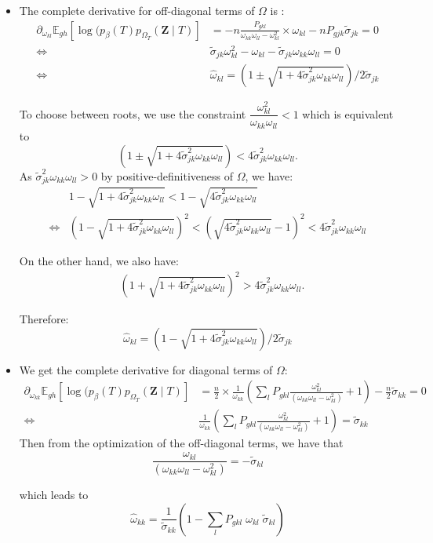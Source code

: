 \documentclass[11pt,a4paper]{article}
\newcommand{\Zbf}{\boldsymbol{Z}}
\newcommand{\Esp}{\mathds{E}}
\begin{document}
\begin{itemize}

\item The complete derivative for off-diagonal terms of $\Omega$ is :
\begin{align*}
 \partial_{\omega_{kl}}\Esp_{gh} [\log (p_\beta(T)p_{\Omega_T}(\Zbf\mid T) ] &=-n \frac{P_{gkl} }{\omega_{kk}\omega_{ll}-\omega_{kl}^2}\times \omega_{kl} - n P_{gjk}  \widetilde{\sigma}_{jk} =0\\
 \iff & \widetilde{\sigma}_{jk} \omega_{kl}^2 - \omega_{kl} - \widetilde{\sigma}_{jk} \omega_{kk}\omega_{ll} = 0 \\
 \iff & \widehat{\omega}_{kl} = (1 \pm \sqrt{1+4\widetilde{\sigma}_{jk}^2 \omega_{kk}\omega_{ll}}) / 2\widetilde{\sigma}_{jk}
\end{align*}

To choose between roots, we use the constraint $\dfrac{\omega_{kl}^2}{\omega_{kk}\omega_{ll}} < 1$ which is equivalent to 
$$ (1 \pm \sqrt{1+4\widetilde{\sigma}_{jk}^2 \omega_{kk}\omega_{ll}}) < 4\widetilde{\sigma}_{jk}^2 \omega_{kk}\omega_{ll}.$$
As $\widetilde{\sigma}_{jk}^2 \omega_{kk}\omega_{ll} > 0$ by positive-definitiveness of $\Omega$, we have:
\begin{align*}
&1 - \sqrt{1+4\widetilde{\sigma}_{jk}^2 \omega_{kk}\omega_{ll}} < 1- \sqrt{4\widetilde{\sigma}_{jk}^2 \omega_{kk}\omega_{ll}}\\
\iff &(1 - \sqrt{1+4\widetilde{\sigma}_{jk}^2 \omega_{kk}\omega_{ll}})^2 < ( \sqrt{4\widetilde{\sigma}_{jk}^2 \omega_{kk}\omega_{ll}}-1)^2 < 4\widetilde{\sigma}_{jk}^2 \omega_{kk}\omega_{ll}
\end{align*}

On the other hand, we also have:
\begin{align*}
&(1 + \sqrt{1+4\widetilde{\sigma}_{jk}^2 \omega_{kk}\omega_{ll}})^2 >4\widetilde{\sigma}_{jk}^2 \omega_{kk}\omega_{ll}.
\end{align*}

Therefore: $$\boxed{ \widehat{\omega}_{kl} = (1 - \sqrt{1+4\widetilde{\sigma}_{jk}^2 \omega_{kk}\omega_{ll}}) / 2\widetilde{\sigma}_{jk}}$$


\item We get the complete derivative for diagonal terms of $\Omega$:
\begin{align*}
 \partial_{\omega_{kk}}\Esp_{gh} [\log (p_\beta(T)p_{\Omega_T}(\Zbf\mid T) ] &=\frac{n}{2} \times\frac{1}{\omega_{kk}} \left(\sum_l P_{gkl} \frac{\omega_{kl}^2}{(\omega_{kk}\omega_{ll}-\omega_{kl}^2)} + 1\right) -\frac{n}{2}\widetilde{\sigma}_{kk} =0\\
 \iff &  \frac{1}{\omega_{kk}} \left(\sum_l P_{gkl} \frac{\omega_{kl}^2}{(\omega_{kk}\omega_{ll}-\omega_{kl}^2)} + 1\right) =\widetilde{\sigma}_{kk}
\end{align*}
Then from the optimization of the off-diagonal terms, we have that $$\frac{\omega_{kl}}{(\omega_{kk}\omega_{ll}-\omega_{kl}^2)}  = - \widetilde{\sigma}_{kl}  $$

which leads to 
$$\boxed{ \hat{\omega}_{kk} = \frac{1}{\widetilde{\sigma}_{kk}} \left( 1- \sum_l  P_{gkl} \;\omega_{kl} \;\widetilde{\sigma}_{kl}\right)}$$
\end{itemize}
\end{document}
